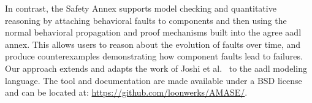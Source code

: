 In contrast, the Safety Annex supports model checking and quantitative reasoning by attaching behavioral faults to components and then using the normal behavioral propagation and proof mechanisms built into the \gls{agree} \gls{aadl} annex.  This allows users to reason about the evolution of faults over time, and produce counterexamples demonstrating how component faults lead to failures.
Our approach extends and adapts the work of Joshi et al.~\cite{Joshi05:Dasc} to the \gls{aadl} modeling language.  
The tool and documentation are made available under a BSD license and can be located at: \small \url{https://github.com/loonwerks/AMASE/}. \normalsize